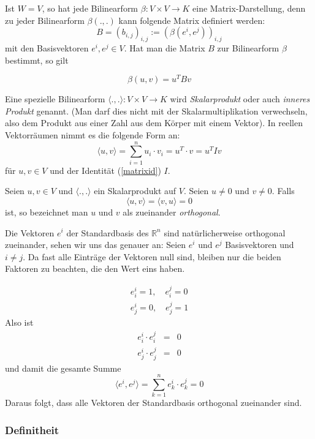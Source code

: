 Ist $W=V$, so hat jede Bilinearform $\beta:V\times V\longrightarrow K$ eine Matrix-Darstellung, denn zu jeder Bilinearform $\beta(.,.)$ kann folgende Matrix definiert werden:
\[
B = (b_{i,j})_{i,j} := (\beta(e^i, e^j))_{i,j}
\]
mit den Basisvektoren $e^i, e^j\in V$. Hat man die Matrix $B$ zur Bilinearform $\beta$ bestimmt, so gilt 

\[
\beta(u,v) = u^T B v
\]


\begin{definition}
Eine spezielle Bilinearform $\langle .,.\rangle : V\times V \longrightarrow K$ wird \emph{Skalarprodukt} oder auch \emph{inneres Produkt} genannt. (Man darf dies nicht mit der Skalarmultiplikation verwechseln, also dem Produkt aus einer Zahl aus dem Körper mit einem Vektor). In reellen Vektorräumen nimmt es die folgende Form an:
\[
\langle u,v \rangle = \sum_{i=1}^{n} u_i\cdot v_i = u^T \cdot v = u^T I v
\]
für $u,v \in V$ und der Identität (\ref{matrixid}) $I$.
\end{definition}

\begin{definition}
Seien $u,v \in V$ und $\langle .,.\rangle$ ein Skalarprodukt auf $V$. Seien $u\ne 0$ und $v\ne 0$. Falls 
\[ \langle u,v \rangle = \langle v,u \rangle = 0\]
ist, so bezeichnet man $u$ und $v$ als zueinander \emph{orthogonal}. 
\end{definition}

Die Vektoren $e^i$ der Standardbasis des $\mathbb{R}^n$ sind natürlicherweise orthogonal zueinander, sehen wir uns das genauer an: Seien $e^i$ und $e^j$ Basisvektoren und $i\ne j$. Da fast alle Einträge der Vektoren null sind, bleiben nur die beiden Faktoren zu beachten, die den Wert eins haben. 

\begin{eqnarray*}
e^i_i = 1, \quad e^j_i = 0 \\
e^i_j = 0, \quad e^j_j = 1
\end{eqnarray*}
Also ist 
\begin{eqnarray*}
e^i_i \cdot e^j_i &=& 0 \\
e^i_j \cdot e^j_j &=& 0 
\end{eqnarray*}
und damit die gesamte Summe 
\[
\langle e^i, e^j\rangle = \sum_{k=1}^{n} e^i_k \cdot e^j_k = 0
\]
Daraus folgt, dass alle Vektoren der Standardbasis orthogonal zueinander sind.


\subsubsection{Definitheit}


